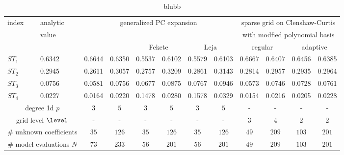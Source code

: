 
\begin{table}[!ht]
  \fontsize{8pt}{3ex}\selectfont
  \renewcommand{\arraystretch}{1.2}
  \begin{tabularx}{\textwidth}{XXXXXXXXXXXX}
    \toprule
    index &
    analytic &
    \multicolumn{6}{c}{generalized PC expansion} &
    \multicolumn{4}{c}{sparse grid on Clenshaw-Curtis} \\
    &
    value &
    & & & & & &
    \multicolumn{4}{c}{with modfied polynomial basis} \\
    \hline
    & &
    \multicolumn{2}{c}{\citet{Sudret08Global}} &
    \multicolumn{2}{c}{Fekete} &
    \multicolumn{2}{c}{Leja} &
    \multicolumn{2}{c}{regular} &
    \multicolumn{2}{c}{adaptive} \\
    \toprule
    $ST_1$ & 0.6342 & 0.6644 & 0.6350 & 0.5537 & 0.6102 & 0.5579 & 0.6103 & 0.6667 & 0.6407 & 0.6456 & 0.6385 \\
    $ST_2$ & 0.2945 & 0.2611 & 0.3057 & 0.2757 & 0.3209 & 0.2861 & 0.3143 & 0.2814 & 0.2957 & 0.2935 & 0.2964 \\
    $ST_3$ & 0.0756 & 0.0581 & 0.0756 & 0.0677 & 0.0875 & 0.0767 & 0.0946 & 0.0573 & 0.0746 & 0.0728 & 0.0761 \\
    $ST_4$ & 0.0227 & 0.0164 & 0.0220 & 0.1478 & 0.0280 & 0.1578 & 0.0329 & 0.0154 & 0.0216 & 0.0205 & 0.0228 \\
    \hline
    \multicolumn{2}{c}{degree 1d $p$} &
    \multicolumn{1}{c}{$3$} &
    \multicolumn{1}{c}{$5$} &
    \multicolumn{1}{c}{$3$} &
    \multicolumn{1}{c}{$5$} &
    \multicolumn{1}{c}{$3$} &
    \multicolumn{1}{c}{$5$} &
    \multicolumn{1}{c}{-} &
    \multicolumn{1}{c}{-} &
    \multicolumn{1}{c}{-} &
    \multicolumn{1}{c}{-} \\
    \multicolumn{2}{c}{grid level $\level$} &
    \multicolumn{1}{c}{-} &
    \multicolumn{1}{c}{-} &
    \multicolumn{1}{c}{-} &
    \multicolumn{1}{c}{-} &
    \multicolumn{1}{c}{-} &
    \multicolumn{1}{c}{-} &
    \multicolumn{1}{c}{$3$} &
    \multicolumn{1}{c}{$4$} &
    \multicolumn{1}{c}{$2$} &
    \multicolumn{1}{c}{$2$} \\
    \multicolumn{2}{c}{\# unknown coefficients} &
    \multicolumn{1}{c}{$35$} &
    \multicolumn{1}{c}{$126$} &
    \multicolumn{1}{c}{$35$} &
    \multicolumn{1}{c}{$126$} &
    \multicolumn{1}{c}{$35$} &
    \multicolumn{1}{c}{$126$} &
    \multicolumn{1}{c}{$49$} &
    \multicolumn{1}{c}{$209$} &
    \multicolumn{1}{c}{$103$} &
    \multicolumn{1}{c}{$201$} \\
    \multicolumn{2}{c}{\# model evaluations $N$} &
    \multicolumn{1}{c}{$73$} &
    \multicolumn{1}{c}{$233$} &
    \multicolumn{1}{c}{$56$} &
    \multicolumn{1}{c}{$201$} &
    \multicolumn{1}{c}{$56$} &
    \multicolumn{1}{c}{$201$} &
    \multicolumn{1}{c}{$49$} &
    \multicolumn{1}{c}{$209$} &
    \multicolumn{1}{c}{$103$} &
    \multicolumn{1}{c}{$201$} \\
    \bottomrule
  \end{tabularx}
  \caption{blubb}
  \label{tab::sobolgfunction-reduced-model-anova}
\end{table}
